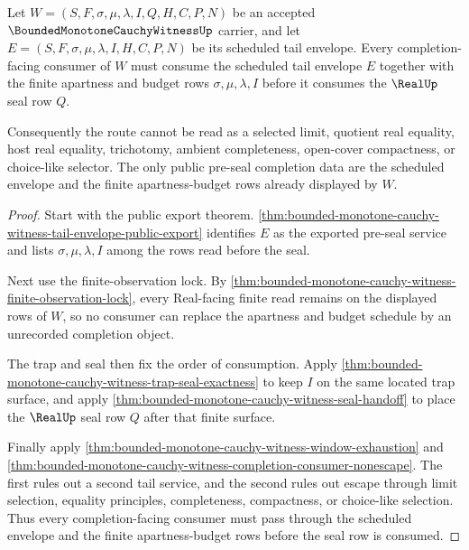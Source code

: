 \begin{theorem}
\label{thm:bounded-monotone-cauchy-witness-completion-consumer-apartness-budget}
Let $W=(S,F,\sigma,\mu,\lambda,I,Q,H,C,P,N)$ be an accepted $\BoundedMonotoneCauchyWitnessUp$ carrier, and let $E=(S,F,\sigma,\mu,\lambda,I,H,C,P,N)$ be its scheduled tail envelope. Every completion-facing consumer of $W$ must consume the scheduled tail envelope $E$ together with the finite apartness and budget rows $\sigma,\mu,\lambda,I$ before it consumes the $\RealUp$ seal row $Q$.

Consequently the route cannot be read as a selected limit, quotient real equality, host real equality, trichotomy, ambient completeness, open-cover compactness, or choice-like selector. The only public pre-seal completion data are the scheduled envelope and the finite apartness-budget rows already displayed by $W$.
\end{theorem}
\begin{proof}
Start with the public export theorem. \autoref{thm:bounded-monotone-cauchy-witness-tail-envelope-public-export} identifies $E$ as the exported pre-seal service and lists $\sigma,\mu,\lambda,I$ among the rows read before the seal.

Next use the finite-observation lock. By \autoref{thm:bounded-monotone-cauchy-witness-finite-observation-lock}, every Real-facing finite read remains on the displayed rows of $W$, so no consumer can replace the apartness and budget schedule by an unrecorded completion object.

The trap and seal then fix the order of consumption. Apply \autoref{thm:bounded-monotone-cauchy-witness-trap-seal-exactness} to keep $I$ on the same located trap surface, and apply \autoref{thm:bounded-monotone-cauchy-witness-seal-handoff} to place the $\RealUp$ seal row $Q$ after that finite surface.

Finally apply \autoref{thm:bounded-monotone-cauchy-witness-window-exhaustion} and \autoref{thm:bounded-monotone-cauchy-witness-completion-consumer-nonescape}. The first rules out a second tail service, and the second rules out escape through limit selection, equality principles, completeness, compactness, or choice-like selection. Thus every completion-facing consumer must pass through the scheduled envelope and the finite apartness-budget rows before the seal row is consumed.
\end{proof}

